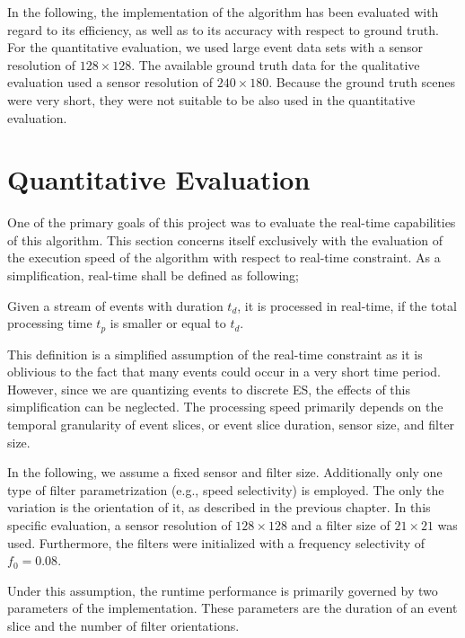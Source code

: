 In the following, the implementation of the algorithm has been evaluated with regard to its efficiency, as well as to its accuracy with respect to ground truth. 
For the quantitative evaluation, we used large event data sets with a sensor resolution of $128\times128$.
The available ground truth data for the qualitative evaluation used a sensor resolution of $240\times180$.
Because the ground truth scenes were very short, they were not suitable to be also used in the quantitative evaluation.

\section{Quantitative Evaluation}

One of the primary goals of this project was to evaluate the real-time capabilities of this algorithm.
This section concerns itself exclusively with the evaluation of the execution speed of the algorithm with respect to real-time constraint. As a simplification, real-time shall be defined as following;
\begin{defwrp}
	Given a stream of events with duration $t_d$, it is processed in real-time, if the total processing time $t_p$ is smaller or equal to $t_d$.
\end{defwrp}

This definition is a simplified assumption of the real-time constraint as it is oblivious to the fact that many events could occur in a very short time period.
However, since we are quantizing events to discrete ES, the effects of this simplification can be neglected.
The processing speed primarily depends on the temporal granularity of event slices, or event slice duration, sensor size, and filter size.

In the following, we assume a fixed sensor and filter size.
Additionally only one type of filter parametrization (e.g., speed selectivity) is employed.
The only the variation is the orientation of it, as described in the previous chapter.
In this specific evaluation, a sensor resolution of $128\times128$ and a filter size of $21\times21$ was used.
Furthermore, the filters were initialized with a frequency selectivity of $f_0=0.08$.

Under this assumption, the runtime performance is primarily governed by two parameters of the implementation.
These parameters are the duration of an event slice and the number of filter orientations. 

